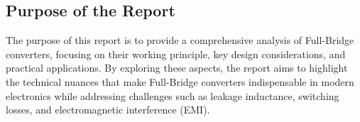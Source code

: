 \subsection{Purpose of the Report}
\noindent The purpose of this report is to provide a comprehensive analysis of Full-Bridge converters, focusing on their working principle, key design considerations, and practical applications. By exploring these aspects, the report aims to highlight the technical nuances that make Full-Bridge converters indispensable in modern electronics while addressing challenges such as leakage inductance, switching losses, and electromagnetic interference (EMI).
